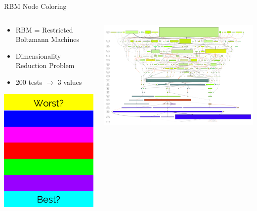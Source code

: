 \documentclass{beamer}
\begin{document}
\begin{frame}{RBM Node Coloring}
\begin{columns}
\begin{column}{.4\textwidth}
\begin{itemize}
\item RBM = Restricted Boltzmann Machines
\item Dimensionality Reduction Problem
\item 200 tests $\rightarrow$ 3 values
\end{itemize}
\center
\includegraphics[height=0.4\textheight]{Illustrations/RBM.pdf}
\end{column}
\begin{column}{.6\textwidth}
\includegraphics[width=\textwidth]{Illustrations/run0_RBM_color_full_30000.pdf}

\end{column}
\end{columns}
\end{frame}
\end{document}
